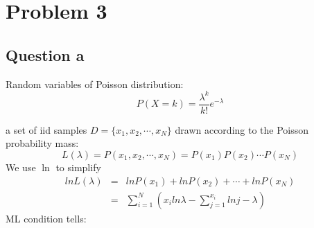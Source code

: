 \documentclass[12pt,letterpaper]{article}
\begin{document}
%
%
%
%
%
%
%
%



\section{Problem 3}
\subsection*{Question a}
Random variables of Poisson distribution:
\begin{equation}\label{3aeq1}
  P(X=k)=\frac{\lambda^k}{k!}e^{-\lambda}
\end{equation}

a set of iid samples $D=\{x_1,x_2,\cdots,x_N\}$ drawn according to the Poisson probability mass:
\begin{equation}\label{3aeq2}
  L(\lambda)=P(x_1,x_2,\cdots,x_N)=P(x_1)P(x_2)\cdots P(x_N)
\end{equation}
We use $\ln$ to simplify
\begin{eqnarray}\label{3aeq3}
lnL(\lambda)
&=&lnP(x_1)+lnP(x_2)+\cdots+lnP(x_N)\\
&=&\sum^N_{i=1}(x_iln\lambda-\sum^{x_i}_{j=1}lnj-\lambda)\nonumber
\end{eqnarray}
ML condition tells:
\end{document}
